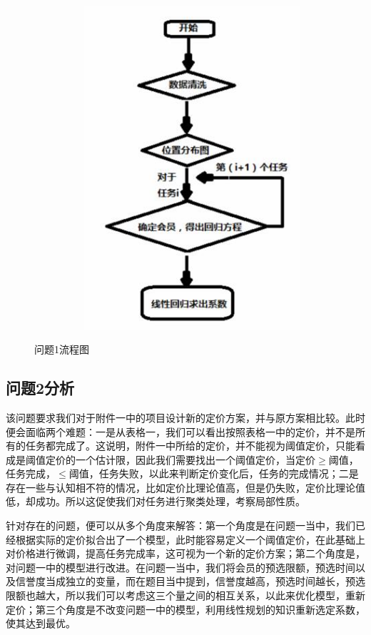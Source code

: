 \documentclass{ctexart}
\begin{document}
\begin{figure}[!h]\centering
\ \ \ \ \ \ \ \ \  \ \includegraphics[width=8cm]{流程图1.jpg}
\caption*{问题1流程图}
\end{figure}


\subsection{问题2分析}

该问题要求我们对于附件一中的项目设计新的定价方案，并与原方案相比较。此时便会面临两个难题：一是从表格一，我们可以看出按照表格一中的定价，并不是所有的任务都完成了。这说明，附件一中所给的定价，并不能视为阈值定价，只能看成是阈值定价的一个估计限，因此我们需要找出一个阈值定价，当定价$\geq$阈值，任务完成，$\leq$阈值，任务失败，以此来判断定价变化后，任务的完成情况；二是存在一些与认知相不符的情况，比如定价比理论值高，但是仍失败，定价比理论值低，却成功。所以这促使我们对任务进行聚类处理，考察局部性质。

针对存在的问题，便可以从多个角度来解答：第一个角度是在问题一当中，我们已经根据实际的定价拟合出了一个模型，此时能容易定义一个阈值定价，在此基础上对价格进行微调，提高任务完成率，这可视为一个新的定价方案；第二个角度是，对问题一中的模型进行改进。在问题一当中，我们将会员的预选限额，预选时间以及信誉度当成独立的变量，而在题目当中提到，信誉度越高，预选时间越长，预选限额也越大，所以我们可以考虑这三个量之间的相互关系，以此来优化模型，重新定价；第三个角度是不改变问题一中的模型，利用线性规划的知识重新选定系数，使其达到最优。
\end{document}
